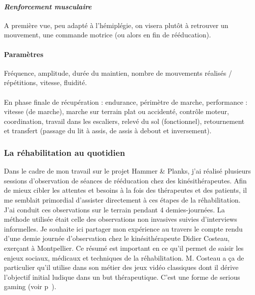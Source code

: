 	\paragraph{\emph{Renforcement musculaire} \\ }
A première vue, peu adapté à l’hémiplégie, on visera plutôt à retrouver un mouvement, une commande motrice (ou alors en fin de rééducation).

	\paragraph{Paramètres \\}
Fréquence, amplitude, durée du maintien, nombre de mouvements réalisés / répétitions, vitesse, fluidité.

\paragraph{}En phase finale de récupération : endurance, périmètre de marche, performance : vitesse (de marche), marche sur terrain plat ou accidenté, contrôle moteur, coordination, travail dans les escaliers, relevé du sol (fonctionnel), retournement et transfert (passage du lit à assis, de assis à debout et inversement).

	\subsubsection{La réhabilitation au quotidien}
Dans le cadre de mon travail sur le projet Hammer \& Planks, j'ai réalisé plusieurs sessions d'observation de séances de rééducation chez des kinésithérapeutes. Afin de mieux cibler les attentes et besoins à la fois des thérapeutes et des patients, il me semblait primordial d'assister directement à ces étapes de la réhabilitation. J'ai conduit ces observations sur le terrain pendant 4 demies-journées. La méthode utilisée était celle des observations non invasives suivies d'interviews informelles.
\newline Je souhaite ici partager mon expérience au travers le compte rendu d'une demie journée d'observation chez le kinésithérapeute Didier Costeau, exerçant à Montpellier. Ce résumé est important en ce qu'il permet de saisir les enjeux sociaux, médicaux et techniques de la réhabilitation. M. Costeau a ça de particulier qu'il utilise dans son métier des jeux vidéo classiques dont il dérive l'objectif initial ludique dans un but thérapeutique. C'est une forme de \gls{serious gaming} (voir p~\pageref{sggt}).

